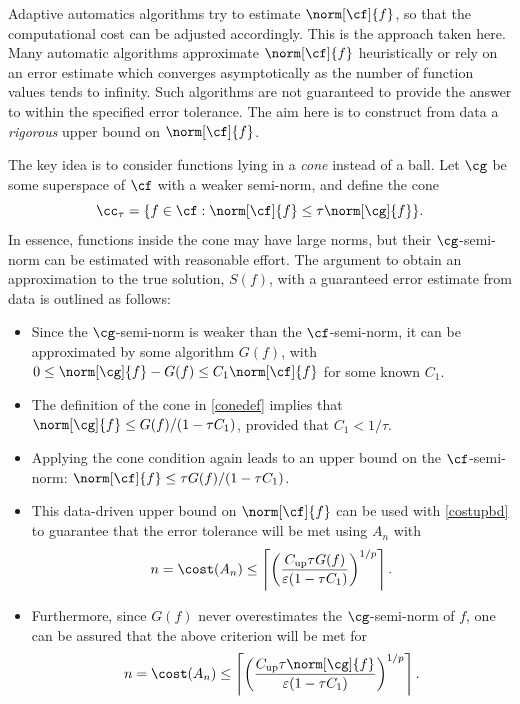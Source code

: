 \documentclass[]{elsarticle}
\DeclareMathOperator{\up}{up}
\theoremstyle{definition}
\theoremstyle{remark}
\begin{document}
Adaptive automatics algorithms try to estimate $\norm[\cf]{f}$, so that the computational cost can be adjusted accordingly. This is the approach taken here.  Many automatic algorithms approximate $\norm[\cf]{f}$ heuristically or rely on an error estimate which converges asymptotically as the number of function values tends to infinity.  Such algorithms are not guaranteed to provide the answer to within the specified error tolerance.  The aim here is to construct from data a \emph{rigorous} upper bound on $\norm[\cf]{f}$.  

The key idea is to consider functions lying in a \emph{cone} instead of a ball.  Let $\cg$ be some superspace of $\cf$ with a weaker semi-norm, and define the cone
\begin{equation} \label{conedef}
\cc_{\tau}=\{f \in \cf : \norm[\cf]{f} \le \tau \norm[\cg]{f} \}.
\end{equation}
In essence, functions inside the cone may have large norms, but their $\cg$-semi-norm can be estimated with reasonable effort.  The argument to obtain an approximation to the true solution, $S(f)$, with a guaranteed error estimate from data is outlined as follows:
\begin{itemize}
\item Since the $\cg$-semi-norm is weaker than the $\cf$-semi-norm, it can be approximated by some algorithm $G(f)$, with $0\le \norm[\cg]{f}-G(f) \le C_1\norm[\cf]{f}$ for some known $C_1$.

\item The definition of the cone in \eqref{conedef} implies that $\norm[\cg]{f} \le G(f)/(1 - \tau C_1)$, provided that $C_1 < 1/\tau$.

\item Applying the cone condition again leads to an upper bound on the $\cf$-semi-norm:  $\norm[\cf]{f} \le \tau G(f)/(1 - \tau C_1)$.

\item This data-driven upper bound on $\norm[\cf]{f}$ can be used with \eqref{costupbd} to guarantee that the error tolerance will be met using $A_n$ with
\[
n=\cost(A_n)\le \left \lceil\left(\frac{ C_{\up}\tau G(f)}{\varepsilon(1 - \tau C_1)}\right)^{1/p} \right \rceil.
\]

\item Furthermore, since $G(f)$ never overestimates the $\cg$-semi-norm of $f$, one can be assured that the above criterion will be met for 
\[
n=\cost(A_n)\le \left \lceil\left(\frac{ C_{\up}\tau \norm[\cg]{f}}{\varepsilon(1 - \tau C_1)}\right)^{1/p} \right \rceil.
\]

\end{itemize} 
\end{document}

